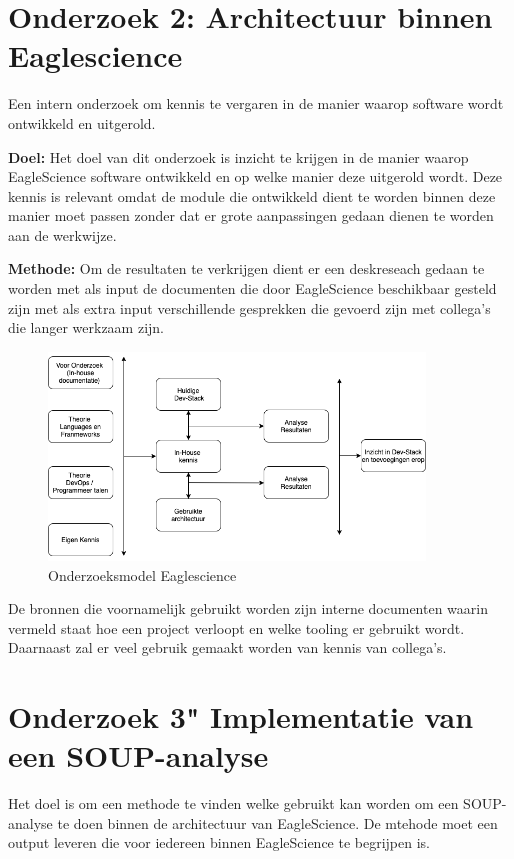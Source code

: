 \section{Onderzoek 2: Architectuur binnen Eaglescience}\label{sec:onderzoeksmethode-architectuur-binnen-eaglescience}
Een intern onderzoek om kennis te vergaren in de manier waarop software wordt ontwikkeld en uitgerold.

\textbf{Doel: }Het doel van dit onderzoek is inzicht te krijgen in de manier waarop EagleScience software ontwikkeld en op welke manier deze uitgerold wordt. Deze kennis is relevant omdat de module die ontwikkeld dient te worden binnen deze manier moet passen zonder dat er grote aanpassingen gedaan dienen te worden aan de werkwijze.

\textbf{Methode: } Om de resultaten te verkrijgen dient er een deskreseach gedaan te worden met als input de documenten die door EagleScience beschikbaar gesteld zijn met als extra input verschillende gesprekken die gevoerd zijn met collega's die langer werkzaam zijn.

\begin{figure}[h!] %
  \myfloatalign
  \includegraphics[width=10cm]{gfx/OnderzoeksmodelES}
  \caption{Onderzoeksmodel Eaglescience}
  \label{fig:OnderzoeksModelEaglescience}
\end{figure}

 De bronnen die voornamelijk gebruikt worden zijn interne documenten waarin vermeld staat hoe een project verloopt en welke tooling er gebruikt wordt. Daarnaast zal er veel gebruik gemaakt worden van kennis van collega's.



\section{Onderzoek 3"  Implementatie van een SOUP-analyse}\label{sec:onderzoek-naar-soup-analyse}
 Het doel is om een methode te vinden welke gebruikt kan worden om een SOUP-analyse te doen binnen de architectuur van EagleScience. De mtehode moet een output leveren die voor iedereen binnen EagleScience te begrijpen is.

